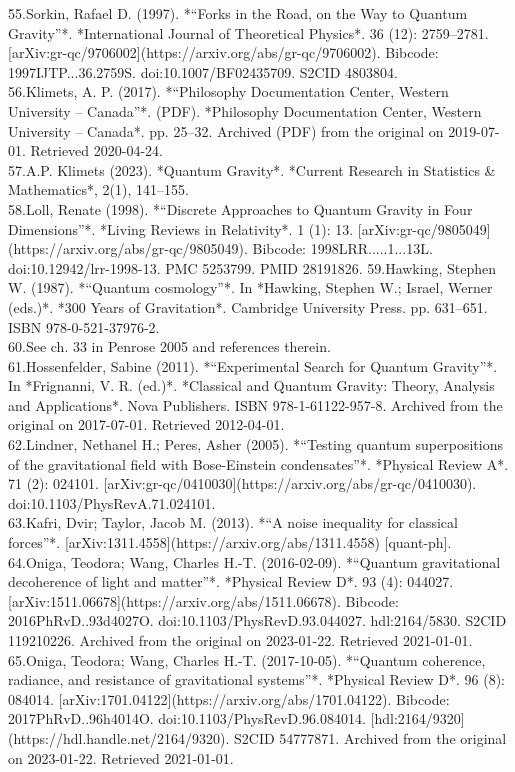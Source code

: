 55.Sorkin, Rafael D. (1997). *“Forks in the Road, on the Way to Quantum Gravity”*. *International Journal of Theoretical Physics*. 36 (12): 2759–2781. [arXiv:gr-qc/9706002](https://arxiv.org/abs/gr-qc/9706002). Bibcode: 1997IJTP...36.2759S. doi:10.1007/BF02435709. S2CID 4803804.\\
56.Klimets, A. P. (2017). *“Philosophy Documentation Center, Western University – Canada”*. (PDF). *Philosophy Documentation Center, Western University – Canada*. pp. 25–32. Archived (PDF) from the original on 2019-07-01. Retrieved 2020-04-24.\\
57.A.P. Klimets (2023). *Quantum Gravity*. *Current Research in Statistics & Mathematics*, 2(1), 141–155.\\
58.Loll, Renate (1998). *“Discrete Approaches to Quantum Gravity in Four Dimensions”*. *Living Reviews in Relativity*. 1 (1): 13. [arXiv:gr-qc/9805049](https://arxiv.org/abs/gr-qc/9805049). Bibcode: 1998LRR.....1...13L. doi:10.12942/lrr-1998-13. PMC 5253799. PMID 28191826.
59.Hawking, Stephen W. (1987). *“Quantum cosmology”*. In *Hawking, Stephen W.; Israel, Werner (eds.)*. *300 Years of Gravitation*. Cambridge University Press. pp. 631–651. ISBN 978-0-521-37976-2.\\
60.See ch. 33 in Penrose 2005 and references therein.\\
61.Hossenfelder, Sabine (2011). *“Experimental Search for Quantum Gravity”*. In *Frignanni, V. R. (ed.)*. *Classical and Quantum Gravity: Theory, Analysis and Applications*. Nova Publishers. ISBN 978-1-61122-957-8. Archived from the original on 2017-07-01. Retrieved 2012-04-01.\\
62.Lindner, Nethanel H.; Peres, Asher (2005). *“Testing quantum superpositions of the gravitational field with Bose-Einstein condensates”*. *Physical Review A*. 71 (2): 024101. [arXiv:gr-qc/0410030](https://arxiv.org/abs/gr-qc/0410030). doi:10.1103/PhysRevA.71.024101.\\
63.Kafri, Dvir; Taylor, Jacob M. (2013). *“A noise inequality for classical forces”*. [arXiv:1311.4558](https://arxiv.org/abs/1311.4558) [quant-ph].\\
64.Oniga, Teodora; Wang, Charles H.-T. (2016-02-09). *“Quantum gravitational decoherence of light and matter”*. *Physical Review D*. 93 (4): 044027. [arXiv:1511.06678](https://arxiv.org/abs/1511.06678). Bibcode: 2016PhRvD..93d4027O. doi:10.1103/PhysRevD.93.044027. hdl:2164/5830. S2CID 119210226. Archived from the original on 2023-01-22. Retrieved 2021-01-01.\\
65.Oniga, Teodora; Wang, Charles H.-T. (2017-10-05). *“Quantum coherence, radiance, and resistance of gravitational systems”*. *Physical Review D*. 96 (8): 084014. [arXiv:1701.04122](https://arxiv.org/abs/1701.04122). Bibcode: 2017PhRvD..96h4014O. doi:10.1103/PhysRevD.96.084014. [hdl:2164/9320](https://hdl.handle.net/2164/9320). S2CID 54777871. Archived from the original on 2023-01-22. Retrieved 2021-01-01.\\

